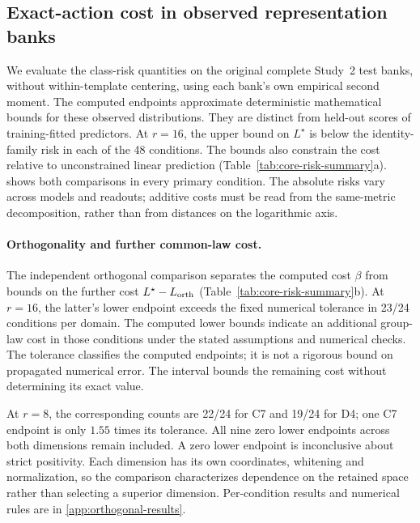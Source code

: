 \subsection{Exact-action cost in observed representation banks}
\label{sec:observed-risk}


We evaluate the class-risk quantities on the original complete Study~2 test banks, without within-template centering, using each bank's own empirical second moment. The computed endpoints approximate deterministic mathematical bounds for these observed distributions. They are distinct from held-out scores of training-fitted predictors. At $r=16$, the upper bound on $L^\star$ is below the identity-family risk in each of the 48 conditions. The bounds also constrain the cost relative to unconstrained linear prediction (Table~\ref{tab:core-risk-summary}a).  shows both comparisons in every primary condition. The absolute risks vary across models and readouts; additive costs must be read from the same-metric decomposition, rather than from distances on the logarithmic axis.

\paragraph{Orthogonality and further common-law cost.}
\label{par:orthogonal-results}
The independent orthogonal comparison separates the computed cost $\beta$ from bounds on the further cost $L^\star-L_{\rm orth}$ (Table~\ref{tab:core-risk-summary}b). At $r=16$, the latter's lower endpoint exceeds the fixed numerical tolerance in 23/24 conditions per domain. The computed lower bounds indicate an additional group-law cost in those conditions under the stated assumptions and numerical checks. The tolerance classifies the computed endpoints; it is not a rigorous bound on propagated numerical error. The interval bounds the remaining cost without determining its exact value.

At $r=8$, the corresponding counts are 22/24 for C7 and 19/24 for D4; one C7 endpoint is only $1.55$ times its tolerance. All nine zero lower endpoints across both dimensions remain included. A zero lower endpoint is inconclusive about strict positivity. Each dimension has its own coordinates, whitening and normalization, so the comparison characterizes dependence on the retained space rather than selecting a superior dimension. Per-condition results and numerical rules are in \cref{app:orthogonal-results}.

